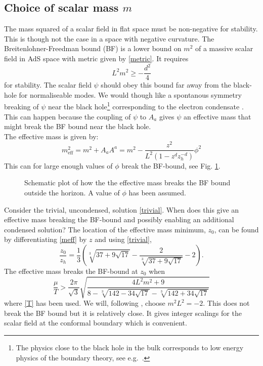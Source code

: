 \documentclass[12pt]{report}
\newcommand{\At}{\ensuremath{{\phi}}}
\begin{document}
\subsection{Choice of scalar mass $m$}
The mass squared of a scalar field in flat space must be non-negative for stability. This is though not the case in a space with negative curvature. The Breitenlohner-Freedman bound (BF) is a lower bound on $m^2$ of a massive scalar field in AdS space with metric given by \eqref{metric}. It requires
\begin{equation}
 L^2m^2\geq-\frac{d^2}{4}\label{BF}
\end{equation}
for stability\cite{Kleban:2004bv}. The scalar field $\psi$ should obey this bound far away from the black-hole for normaliseable modes. We would though like a spontanous symmetry breaking of $\psi$ near the black hole\footnote{The physics close to the black hole in the bulk corresponds to low energy physics of the boundary theory, see e.g.~\cite{McGreevy:2009xe}.} corresponding to the electron condensate \cite{Gubser:2008px}. This can happen because the coupling of $\psi$ to $A_a$ gives $\psi$ an effective mass that might break the BF bound near the black hole. \\The effective mass is given by:
\begin{equation}
 m_{\mathrm{eff}}^2=m^2+A_aA^a
=m^2-\frac{z^2}{L^2(1-z^dz_h^{-d})}\At^2
\label{meff}
\end{equation}
This can for large enough values of $\At$ break the BF-bound, see Fig. \ref{BF}.
\begin{figure}
\centering

\caption{Schematic plot of how the the effective mass breaks the BF bound outside the horizon. A value of $\At$ has been assumed.\label{BF}}
\end{figure}
Consider the trivial, uncondensed, solution \eqref{trivial}. When does this give an effective mass breaking the BF-bound and possibly enabling an additional condensed solution? The location of the effective mass minimum, $z_0$, can be found by differentiating \eqref{meff} by $z$ and using \eqref{trivial},
\begin{equation}
\frac{z_0}{z_h}=\frac{1}{3} \left(\sqrt[3]{37+9 \sqrt{17}}-\frac{2}{\sqrt[3]{37+9 \sqrt{17}}}-2\right).
\end{equation}
The effective mass breaks the BF-bound at $z_0$ when
\begin{equation}
 \frac{\mu}{T}>
\frac{2\pi }{\sqrt{3}} \sqrt{\frac{4 L^2 m^2+9}{8-\sqrt[3]{142-34
   \sqrt{17}}-\sqrt[3]{142+34 \sqrt{17}}}}
\end{equation}
where \eqref{T} has been used. We will, following \cite{hartnoll8, horowitz}, choose $m^2L^2=-2$. This does not break the BF bound but it is relatively close. It gives integer scalings for the scalar field at the conformal boundary which is convenient.%
\end{document}
